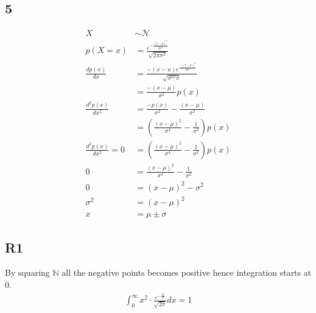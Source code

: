 \documentclass{article}
\begin{document}
\subsection*{5}
\begin{align*}
	X &\sim \mathcal{N}\\
	p(X=x) &= \frac{e^{-\frac{(x-\mu)^2}{2\sigma^2}}}{\sqrt{2\pi\sigma^2}}\\
	\frac{dp(x)}{dx} &=
	\frac{-(x-u)e^{\frac{-(x-\mu)^2}{2\sigma^2}}}{\sqrt{\sigma^62\pi}}\\
	&= \frac{-(x-\mu)}{\sigma^2}p(x)\\
	\frac{d^2p(x)}{dx^2} &= \frac{-p(x)}{\sigma^2} - \frac{(x-\mu)}{\sigma^2}\\
	&= (\frac{(x-\mu)^2}{\sigma^4} - \frac{1}{\sigma^2})p(x)\\
	\frac{d^2p(x)}{dx^2} = 0 &= (\frac{(x-\mu)^2}{\sigma^4} -
	\frac{1}{\sigma^2})p(x)\\
	0 &= \frac{(x-\mu)^2}{\sigma^4} - \frac{1}{\sigma^2}\\
	0 &= (x-\mu)^2 - \sigma^2\\
	\sigma^2  &= (x-\mu)^2\\
	x &= \mu \pm \sigma
\end{align*}

\subsection*{R1}
By squaring $\mathbb{N}$ all the negative points becomes positive hence
integration starts at $0$.
\begin{align*}
	\int_0^\infty x^2\cdot\frac{e^{-\frac{x^2}{2}}}{\sqrt{2\pi}} dx = 1\\
\end{align*}
\end{document}
